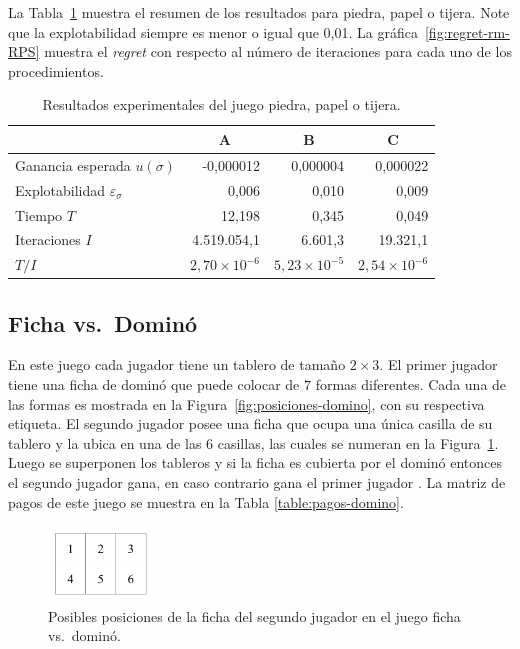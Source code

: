 La Tabla~\ref{table:resultados-rm-RPS} muestra el resumen de los resultados para piedra, papel o tijera. Note que la explotabilidad siempre es menor o igual que 0,01. La gráfica~\ref{fig:regret-rm-RPS} muestra el \textit{regret} con respecto al número de iteraciones para cada uno de los procedimientos.

\begin{table}[t]
\caption{Resultados experimentales del juego piedra, papel o tijera.}
\label{table:resultados-rm-RPS}
\centering
\begin{tabular}{l r r r}
    \toprule
    & \multicolumn{1}{c}{A} & \multicolumn{1}{c}{B} & \multicolumn{1}{c}{C} \\ \midrule
    Ganancia esperada $u(\sigma)$         & -0,000012 & 0,000004 & 0,000022 \\
    Explotabilidad $\varepsilon_{\sigma}$ &  0,006 & 0,010 & 0,009 \\
    Tiempo $T$                            & 12,198 & 0,345 & 0,049 \\
    Iteraciones $I$                       & 4.519.054,1 & 6.601,3 &  19.321,1 \\
    $T/I$                                 & $2,70{\times}10^{-6}$ & $5,23{\times}10^{-5}$ & $2,54{\times}10^{-6}$\\
    \bottomrule
\end{tabular}
\end{table}

\subsection*{Ficha vs.\ Dominó}

En este juego cada jugador tiene un tablero de tamaño $2\times 3$. El primer jugador tiene una ficha de dominó que puede colocar de $7$ formas diferentes. Cada una de las formas es mostrada en la Figura~\ref{fig:posiciones-domino}, con su respectiva etiqueta. El segundo jugador posee una ficha que ocupa una única casilla de su tablero y la ubica en una de las $6$ casillas, las cuales se numeran en la Figura~\ref{fig:posiciones}. Luego se superponen los tableros y si la ficha es cubierta por el dominó entonces el segundo jugador gana, en caso contrario gana el primer jugador \cite[p. 237]{bib:pl-chvatal}. La matriz de pagos de este juego se muestra en la Tabla \ref{table:pagos-domino}.

\begin{figure}[t]
\centering
\includegraphics[width=0.25\textwidth]{figuras/posiciones.png}
\caption{Posibles posiciones de la ficha del segundo jugador en el juego ficha vs.\ dominó.}
\label{fig:posiciones}
\end{figure}

